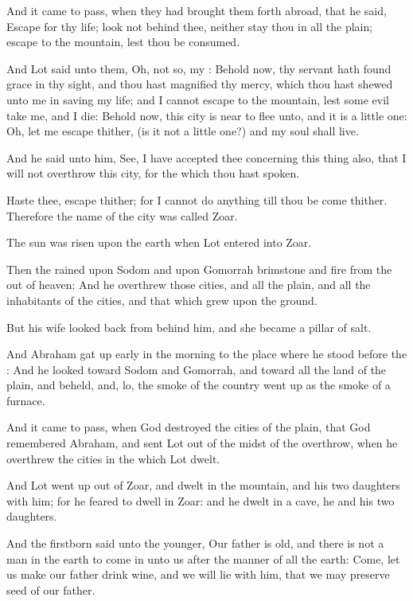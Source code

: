 \verse And it came to pass, when they had brought them forth abroad, that he said, Escape for thy life; look not behind thee, neither stay thou in all the plain; escape to the mountain, lest thou be consumed.

\verse And Lot said unto them, Oh, not so, my \LORD: \verse Behold now, thy servant hath found grace in thy sight, and thou hast magnified thy mercy, which thou hast shewed unto me in saving my life; and I cannot escape to the mountain, lest some evil take me, and I die: \verse Behold now, this city is near to flee unto, and it is a little one: Oh, let me escape thither, (is it not a little one?) and my soul shall live.

\verse And he said unto him, See, I have accepted thee concerning this thing also, that I will not overthrow this city, for the which thou hast spoken.

\verse Haste thee, escape thither; for I cannot do anything till thou be come thither. Therefore the name of the city was called Zoar.

\verse The sun was risen upon the earth when Lot entered into Zoar.

\verse Then the \LORD rained upon Sodom and upon Gomorrah brimstone and fire from the \LORD out of heaven; \verse And he overthrew those cities, and all the plain, and all the inhabitants of the cities, and that which grew upon the ground.

\verse But his wife looked back from behind him, and she became a pillar of salt.

\verse And Abraham gat up early in the morning to the place where he stood before the \LORD: \verse And he looked toward Sodom and Gomorrah, and toward all the land of the plain, and beheld, and, lo, the smoke of the country went up as the smoke of a furnace.

\verse And it came to pass, when God destroyed the cities of the plain, that God remembered Abraham, and sent Lot out of the midst of the overthrow, when he overthrew the cities in the which Lot dwelt.

\verse And Lot went up out of Zoar, and dwelt in the mountain, and his two daughters with him; for he feared to dwell in Zoar: and he dwelt in a cave, he and his two daughters.

\verse And the firstborn said unto the younger, Our father is old, and there is not a man in the earth to come in unto us after the manner of all the earth: \verse Come, let us make our father drink wine, and we will lie with him, that we may preserve seed of our father.


